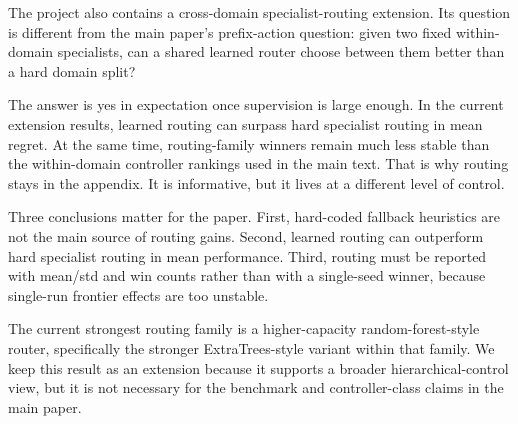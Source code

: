 The project also contains a cross-domain specialist-routing extension.
Its question is different from the main paper's prefix-action question:
given two fixed within-domain specialists, can a shared learned router choose between them better than a hard domain split?

The answer is yes in expectation once supervision is large enough.
In the current extension results, learned routing can surpass hard specialist routing in mean regret.
At the same time, routing-family winners remain much less stable than the within-domain controller rankings used in the main text.
That is why routing stays in the appendix.
It is informative, but it lives at a different level of control.

Three conclusions matter for the paper.
First, hard-coded fallback heuristics are not the main source of routing gains.
Second, learned routing can outperform hard specialist routing in mean performance.
Third, routing must be reported with mean/std and win counts rather than with a single-seed winner, because single-run frontier effects are too unstable.

The current strongest routing family is a higher-capacity random-forest-style router, specifically the stronger ExtraTrees-style variant within that family.
We keep this result as an extension because it supports a broader hierarchical-control view, but it is not necessary for the benchmark and controller-class claims in the main paper.
